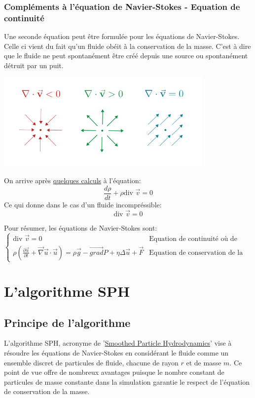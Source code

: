 \documentclass[a4paper,10pt]{report}
\begin{document}
\subsubsection{Compléments à l'équation de Navier-Stokes - Equation de continuité}
Une seconde équation peut être formulée pour les équations de Navier-Stokes. Celle ci vient du fait qu'un fluide obéit à la conservation de la masse. C'est à dire que le fluide ne peut spontanément être créé depuis une source ou spontanément détruit par un puit.
\begin{center}
 \includegraphics[width=0.8\textwidth]{equation_de_continuite_navier-stokes}
\end{center}
On arrive après \href{https://femto-physique.fr/mecanique_des_fluides/cinematique.php#\%C3\%A9quation-de-continuit\%C3\%A9}{quelques calculs} à l'équation:
$$ \frac{d \rho}{dt} + \rho \text{div } \vec{v} = 0$$
Ce qui donne dans le cas d'un fluide incompréssible:
$$ \boxed{\text{div } \vec{v} = 0} $$

\vfill
Pour résumer, les équations de Navier-Stokes sont:
$$
\boxed{\begin{cases}
 \text{div } \vec{v} = 0 & \text{Equation de continuité où de conservation de la masse} \\
 \rho (\frac{\partial \vec{u}}{\partial t} + \vec{\nabla}\vec{u}\cdot \vec{u} ) = \rho \vec{g} - \vec{grad} P + \eta \Delta \vec{u} + \vec{F} & \text{Equation de conservation de la quantité de mouvement}
\end{cases}}
$$
\vfill
\newpage

\section{L'algorithme SPH}

\subsection{Principe de l'algorithme}
L'algorithme SPH, acronyme de '\href{https://en.wikipedia.org/wiki/Smoothed-particle_hydrodynamics}{Smoothed Particle Hydrodynamics}' vise à résoudre les équations de Navier-Stokes en considérant le fluide comme un ensemble discret de particules de fluide, chacune de rayon $r$ et de masse $m$. Ce point de vue offre de nombreux avantages puisque le nombre constant de particules de masse constante dans la simulation garantie le respect de l'équation de conservation de la masse.
\end{document}
